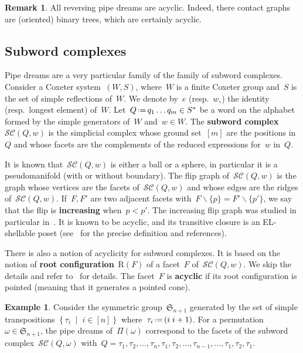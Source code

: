 \documentclass{amsart}
\theoremstyle{definition}
\newtheorem{example}[theorem]{Example}
\newtheorem{remark}[theorem]{Remark}
\newcommand{\set}[2]{\left\{ #1 \;\middle|\; #2 \right\}} %
\newcommand{\ssm}{\smallsetminus} %
\newcommand{\eqdef}{\mbox{\,\raisebox{0.2ex}{\scriptsize\ensuremath{\mathrm:}}\ensuremath{=}\,}} %
\newcommand{\defn}[1]{\textbf{\textsf{\color{PineGreen} #1}}} %
\newcommand{\fS}{\mathfrak{S}} %
\newcommand{\pipeDreams}{\Pi} %
\newcommand{\wo}{w_\circ} %
\newcommand{\subwordComplex}{\mathcal{SC}} %
\newcommand{\Roots}{\mathrm{R}} %
\begin{document}
\begin{remark}
All reversing pipe dreams are acyclic. Indeed, there contact graphs are (oriented) binary trees, which are certainly acyclic.
\end{remark}


\subsection{Subword complexes}
\label{subsec:subwordComplexes}

Pipe dreams are a very particular family of the family of subword complexes. Consider a Coxeter system~$(W,S)$, where~$W$ is a finite Coxeter group and~$S$ is the set of simple reflections of~$W$. We denote by~$e$ (resp.~$\wo$) the identity (resp.~longest element) of~$W$. Let~$Q \eqdef q_1 \dots q_m \in S^*$ be a word on the alphabet formed by the simple generators of~$W$ and~$w \in W$. The \defn{subword complex}~$\subwordComplex(Q,w)$ is the simplicial complex whose ground set~$[m]$ are the positions in~$Q$ and whose facets are the complements of the reduced expressions for~$w$ in~$Q$.

It is known that~$\subwordComplex(Q,w)$ is either a ball or a sphere, in particular it is a pseudomanifold (with or without boundary). The flip graph of~$\subwordComplex(Q,w)$ is the graph whose vertices are the facets of~$\subwordComplex(Q,w)$ and whose edges are the ridges of~$\subwordComplex(Q,w)$. If~$F,F'$ are two adjacent facets with~$F \ssm \{p\} = F' \ssm \{p'\}$, we say that the flip is \defn{increasing} when~$p < p'$. The increasing flip graph was studied in particular in~\cite{PilaudStump-ELlabelings}. It is known to be acyclic, and its transitive closure is an EL-shellable poset (see~\cite{PilaudStump-ELlabelings} for the precise definition and references).

There is also a notion of acyclicity for subword complexes. It is based on the notion of \defn{root configuration}~$\Roots(F)$ of a facet~$F$ of~$\subwordComplex(Q,w)$. We skip the details and refer to~\cite{CeballosLabbeStump, PilaudStump-brickPolytope} for details. The facet~$F$ is \defn{acyclic} if its root configuration is pointed (meaning that it generates a pointed cone).

\begin{example}
Consider the symmetric group~$\fS_{n+1}$ generated by the set of simple transpositions $\set{\tau_i}{i \in [n]}$ where~$\tau_i \eqdef (i \; i+1)$.
For a permutation~$\omega \in \fS_{n+1}$, the pipe dreams of~$\pipeDreams(\omega)$ correspond to the facets of the subword complex~$\subwordComplex(Q,\omega)$ with~$Q = \tau_1, \tau_2, \dots, \tau_n, \tau_1, \tau_2, \dots, \tau_{n-1}, \dots, \tau_1, \tau_2, \tau_1$. %
\end{example}
\end{document}
